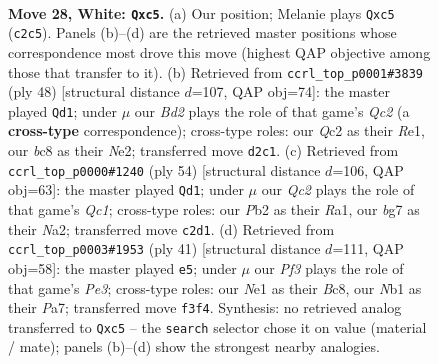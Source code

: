 \documentclass[11pt]{article}
\begin{document}
\clearpage

\begin{figure}[p]\centering
\begin{subfigure}{0.46\textwidth}\centering
\resizebox{\linewidth}{!}{%
\newchessgame
\chessboard[
  setfen={nrbr2k1/5pb1/p5qp/2p1p3/1p2P2n/3P1P2/PPQB2B1/RN2NRK1 w - - 1 28},
  showmover=false,
  pgfstyle=straightmove, color=movearrow, markmove={c2-c5}
]}
\caption{}
\end{subfigure}\hfill
\begin{subfigure}{0.46\textwidth}\centering
\resizebox{\linewidth}{!}{%
\newchessgame
\chessboard[
  setfen={r7/3q1rbk/2bp2np/4pp2/p4P2/P1BP2P1/1PQ1NRBP/4R2K w - - 0 25},
  showmover=false,
  pgfstyle=straightmove, color=movearrow, markmove={c2-d1}
]}
\caption{}
\end{subfigure}
\\[4pt]
\begin{subfigure}{0.46\textwidth}\centering
\resizebox{\linewidth}{!}{%
\newchessgame
\chessboard[
  setfen={r4bk1/1rq2p2/3p1n1p/p1pPn1p1/4P3/RP1bB1PP/N2N1PB1/R1Q3K1 w - - 8 28},
  showmover=false,
  pgfstyle=straightmove, color=movearrow, markmove={c1-d1}
]}
\caption{}
\end{subfigure}\hfill
\begin{subfigure}{0.46\textwidth}\centering
\resizebox{\linewidth}{!}{%
\newchessgame
\chessboard[
  setfen={r1b3k1/pp2q1rp/2n1pn2/3p2NB/2pP4/P1P2Q2/2PB1PP1/R4K1R b - - 4 21},
  showmover=false,
  pgfstyle=straightmove, color=movearrow, markmove={e6-e5}
]}
\caption{}
\end{subfigure}
\caption{\textbf{Move 28, White: \texttt{Qxc5}.} (a) Our position; Melanie plays \texttt{Qxc5} (\texttt{c2c5}). Panels (b)--(d) are the retrieved master positions whose correspondence most drove this move (highest QAP objective among those that transfer to it). (b) Retrieved from \texttt{ccrl\_top\_p0001\#3839} (ply 48) [structural distance $d$=107, QAP obj=74]: the master played \texttt{Qd1}; under $\mu$ our \emph{Bd2} plays the role of that game's \emph{Qc2} (a \textbf{cross-type} correspondence); cross-type roles: our \emph{Q}c2 as their \emph{R}e1, our \emph{b}c8 as their \emph{N}e2; transferred move \texttt{d2c1}. (c) Retrieved from \texttt{ccrl\_top\_p0000\#1240} (ply 54) [structural distance $d$=106, QAP obj=63]: the master played \texttt{Qd1}; under $\mu$ our \emph{Qc2} plays the role of that game's \emph{Qc1}; cross-type roles: our \emph{P}b2 as their \emph{R}a1, our \emph{b}g7 as their \emph{N}a2; transferred move \texttt{c2d1}. (d) Retrieved from \texttt{ccrl\_top\_p0003\#1953} (ply 41) [structural distance $d$=111, QAP obj=58]: the master played \texttt{e5}; under $\mu$ our \emph{Pf3} plays the role of that game's \emph{Pe3}; cross-type roles: our \emph{N}e1 as their \emph{B}c8, our \emph{N}b1 as their \emph{P}a7; transferred move \texttt{f3f4}. Synthesis: no retrieved analog transferred to \texttt{Qxc5} -- the \texttt{search} selector chose it on value (material / mate); panels (b)--(d) show the strongest nearby analogies.}
\label{fig:thought-m54}
\end{figure}
\end{document}
